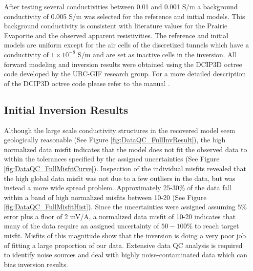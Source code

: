\documentclass[final,authoryear,5p,times,twocolumn]{elsarticle}
\begin{document}
After testing several conductivities between 0.01 and 0.001 S/m a background conductivity of 0.005 S/m was selected for the reference and initial models. This background conductivity is consistent with literature values for the Prairie Evaporite \citep{Duckworth1992,Chouteau1997} and the observed apparent resistivities. The reference and initial models are uniform except for the air cells of the discretized tunnels which have a conductivity of $1 \times 10^{-8}$ S/m and are set as inactive cells in the inversion. All forward modeling and inversion results were obtained using the DCIP3D octree code developed by the UBC-GIF research group. For a more detailed description of the DCIP3D octree code please refer to the manual \citep{DCIP3D_Octree_Manual}.

\subsection{Initial Inversion Results}
\label{InitialInvResults}

Although the large scale conductivity structures in the recovered model seem geologically reasonable (See Figure \ref{fig:DataQC_FullInvResult}), the high normalized data misfit indicates that the model does not fit the observed data to within the tolerances specified by the assigned uncertainties (See Figure \ref{fig:DataQC_FullMisfitCurve}). Inspection of the individual misfits revealed that the high global data misfit was not due to a few outliers in the data, but was instead a more wide spread problem. Approximately 25-30$\%$ of the data fall within a band of high normalized misfits between 10-20 (See Figure \ref{fig:DataQC_FullMisfitHist}). Since the uncertainties were assigned assuming $5\%$ error plus a floor of 2 mV/A, a normalized data misfit of 10-20 indicates that many of the data require an assigned uncertainty of $50-100\%$ to reach target misfit. Misfits of this magnitude show that the inversion is doing a very poor job of fitting a large proportion of our data. Extensive data QC analysis is required to identify noise sources and deal with highly noise-contaminated data which can bias inversion results.
\end{document}
